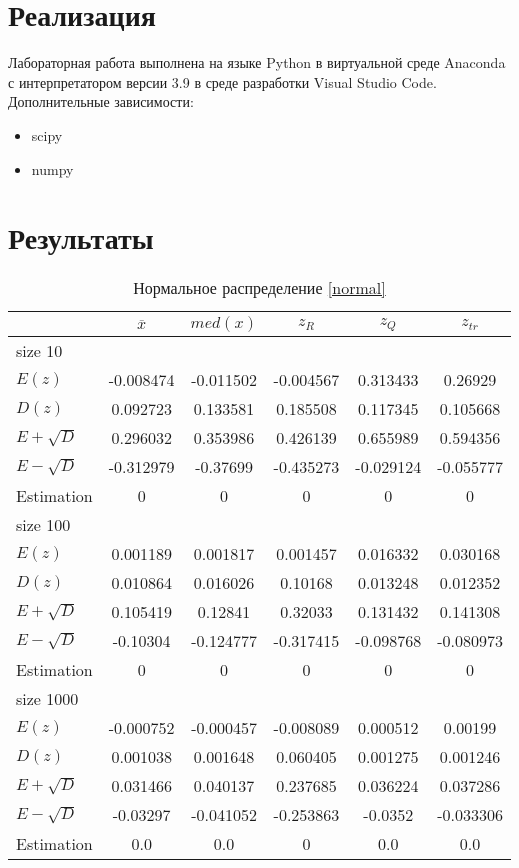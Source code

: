 \documentclass[12pt,a4paper]{article}
\begin{document}
\section{Реализация}
Лабораторная работа выполнена на языке Python в виртуальной среде Anaconda с интерпретатором версии 3.9 в среде разработки Visual Studio Code. Дополнительные зависимости:
\begin{itemize}
    \item scipy
    \item numpy
\end{itemize}


\section {Результаты}
\begin{table}[H]
    \centering
    \begin{tabular}{|l||c|c|c|c|c|}
        \hline
        & $\overline{x}$ & $med(x)$ & $z_R$ & $z_Q$ & $z_{tr}$\\\hline\hline
        size 10 & & & & &\\\hline
        $E(z)$ & -0.008474 & -0.011502 & -0.004567 & 0.313433 & 0.26929 \\\hline
        $D(z)$ & 0.092723 & 0.133581 & 0.185508 & 0.117345 & 0.105668 \\\hline
        $E + \sqrt D$ & 0.296032 & 0.353986 & 0.426139 & 0.655989 & 0.594356 \\\hline
        $E - \sqrt D$ & -0.312979 & -0.37699 & -0.435273 & -0.029124 & -0.055777 \\\hline
        Estimation & 0 & 0 & 0 & 0 & 0 \\\hline
        size 100 & & & & &\\\hline
        $E(z)$ & 0.001189 & 0.001817 & 0.001457 & 0.016332 & 0.030168 \\\hline
        $D(z)$ & 0.010864 & 0.016026 & 0.10168 & 0.013248 & 0.012352 \\\hline
        $E + \sqrt D$ & 0.105419 & 0.12841 & 0.32033 & 0.131432 & 0.141308 \\\hline
        $E - \sqrt D$ & -0.10304 & -0.124777 & -0.317415 & -0.098768 & -0.080973 \\\hline
        Estimation & 0 & 0 & 0 & 0 & 0 \\\hline
        size 1000 & & & & &\\\hline
        $E(z)$ & -0.000752 & -0.000457 & -0.008089 & 0.000512 & 0.00199 \\\hline
        $D(z)$ & 0.001038 & 0.001648 & 0.060405 & 0.001275 & 0.001246 \\\hline
        $E + \sqrt D$ & 0.031466 & 0.040137 & 0.237685 & 0.036224 & 0.037286 \\\hline
        $E - \sqrt D$ & -0.03297 & -0.041052 & -0.253863 & -0.0352 & -0.033306 \\\hline
        Estimation & 0.0 & 0.0 & 0 & 0.0 & 0.0 \\\hline
    \end{tabular}
    \caption{Нормальное распределение \eqref{normal}}
    \label{tab:normal}
\end{table}
\end{document}

